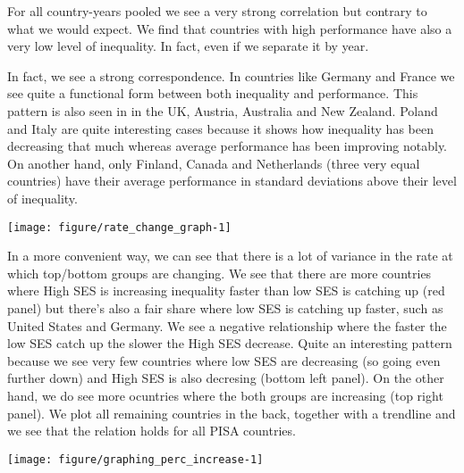 \documentclass[11pt, a4paper]{article}\usepackage[]{graphicx}\usepackage[]{color}
\begin{document}
For all country-years pooled we see a very strong correlation but contrary to what we would expect. We find that countries with high performance have also a very low level of inequality. In fact, even if we separate it by year.





In fact, we see a strong correspondence. In countries like Germany and France we see quite a functional form between both inequality and performance. This pattern is also seen in in the UK, Austria, Australia and New Zealand. Poland and Italy are quite interesting cases because it shows how inequality has been decreasing that much whereas average performance has been improving notably. On another hand, only Finland, Canada and Netherlands (three very equal countries) have their average performance in standard deviations above their level of inequality.







{\centering \texttt{[image: figure/rate\_change\_graph-1]} 

}




In a more convenient way, we can see that there is a lot of variance in the rate at which top/bottom groups are changing. We see that there are more countries where High SES is increasing inequality faster than low SES is catching up (red panel) but there's also a fair share where low SES is catching up faster, such as United States and Germany. We see a negative relationship where the faster the low SES catch up the slower the High SES decrease. Quite an interesting pattern because we see very few countries where low SES are decreasing (so going even further down) and High SES is also decresing (bottom left panel). On the other hand, we do see more ocuntries where the both groups are increasing (top right panel). We plot all remaining countries in the back, together with a trendline and we see that the relation holds for all PISA countries.





{\centering \texttt{[image: figure/graphing\_perc\_increase-1]} 

}









\end{document}
